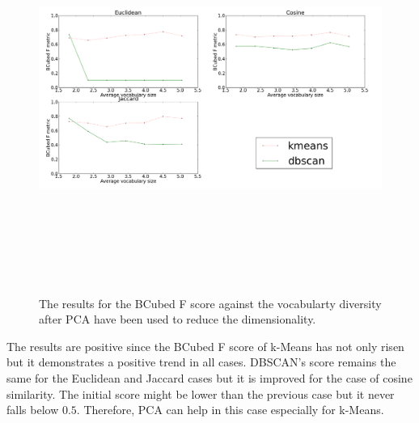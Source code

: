 \begin{figure}[htbp]
  \begin{center}
    \includegraphics[height=5in, width=6in]{vocabulary_pca}
    \caption{The results for the BCubed F score against the vocabularty diversity after PCA have been used to reduce the dimensionality.}
    \label{DifferentVocabularyPCAResults}
  \end{center}
\end{figure}
The results are positive since the BCubed F score of k-Means has not only risen but it demonstrates a positive trend in all cases. DBSCAN's score remains the same for the Euclidean and Jaccard cases but it is improved for the case of cosine similarity. The initial score might be lower than the previous case but it never falls below $0.5$. Therefore, PCA can help in this case especially for k-Means.

